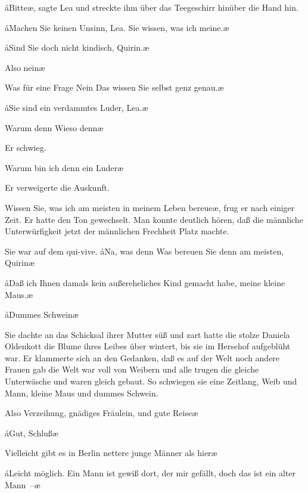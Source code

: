 \aa{}Bitte\ae{}, sagte Lea und streckte ihm über das Teegeschirr hinüber
die Hand hin.

\aa{}Machen Sie keinen Unsinn, Lea. Sie wissen, was ich
meine.\ae{}

\aa{}Sind Sie doch nicht kindisch, Quirin.\ae{}

\aanah{}Also nein\frag{}\ae{}

\aanah{}Was für eine Frage\ausr{} Nein\ausr{} Das wissen Sie selbst genz
genau.\ae{}

\aa{}Sie sind ein verdammtes Luder, Lea.\ae{}

\aanah{}Warum denn\frag{} Wieso denn\frag{}\ae{}

Er schwieg.

\aanah{}Warum bin ich denn ein Luder\frag{}\ae{}

Er verweigerte die Auskunft.

\aanah{}Wissen Sie, was ich am meisten in meinem Leben bereue\ae{},
frug er nach einiger Zeit. Er hatte den Ton gewechselt. Man
konnte deutlich hören, daß die männliche Unterwürfigkeit jetzt
der männlichen Frechheit Platz machte.

Sie war auf dem qui-vive. \aa{}Na, was denn\frag{} Was bereuen
Sie denn am meisten, Quirin\frag{}\ae{}

\aa{}Daß ich Ihnen damals kein außereheliches Kind gemacht
habe, meine kleine Maus.\ae{}

\aa{}Dummes Schwein\ausr{}\ae{}

Sie dachte an das Schicksal ihrer Mutter\dopp{} süß und zart hatte
die stolze Daniela Oldenkott die Blume ihres Leibes über\-%
wintert, bis sie im Hersehof aufgeblüht war. Er klammerte
sich an den Gedanken, daß es auf der Welt noch andere Frauen
gab\dopp{} die Welt war voll von Weibern und alle trugen die gleiche
Unterwäsche und waren gleich gebaut. So schwiegen sie eine
Zeitlang, Weib und Mann, kleine Maus und dummes
Schwein.

\aanah{}Also Verzeihung, gnädiges Fräulein, und gute Reise\ausr{}\ae{}

\aa{}Gut, Schluß\ausr{}\ae{}

\aanah{}Vielleicht gibt es in Berlin nettere junge Männer als hier\frag{}\ae{}

\aa{}Leicht möglich. Ein Mann ist gewiß dort, der mir gefällt,
doch das ist ein alter Mann~--\ae{}

